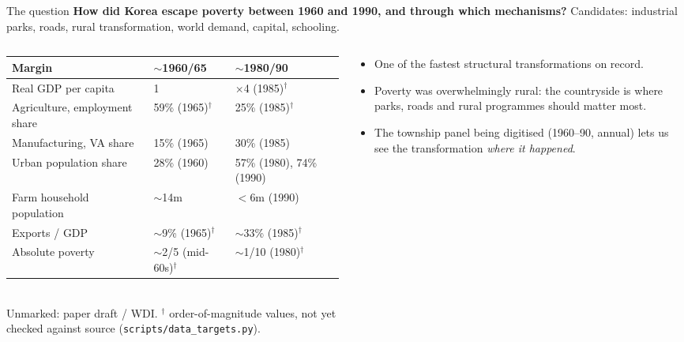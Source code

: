 \documentclass[10pt,aspectratio=169]{beamer}
\newcommand{\hl}[1]{\textcolor{mOrange}{#1}}
\newcommand{\unv}{$^{\dagger}$}
\begin{document}
\begin{frame}{The question}
  \textbf{How did Korea escape poverty between 1960 and 1990, and through which mechanisms?}
  Candidates: industrial parks, roads, rural transformation, world demand, capital, schooling.
  \vspace{0.6em}

  \begin{columns}[T]
    \begin{column}{0.6\textwidth}
      \scriptsize
      \begin{tabular}{@{}lll@{}}
        \toprule
        Margin & $\sim$1960/65 & $\sim$1980/90 \\
        \midrule
        Real GDP per capita & 1 & $\times$4 (1985)\unv \\
        Agriculture, employment share & 59\% (1965)\unv & 25\% (1985)\unv \\
        Manufacturing, VA share & 15\% (1965) & 30\% (1985) \\
        Urban population share & 28\% (1960) & 57\% (1980), 74\% (1990) \\
        Farm household population & $\sim$14m & $<$6m (1990) \\
        Exports / GDP & $\sim$9\% (1965)\unv & $\sim$33\% (1985)\unv \\
        Absolute poverty & $\sim$2/5 (mid-60s)\unv & $\sim$1/10 (1980)\unv \\
        \bottomrule
      \end{tabular}\\[0.3em]
      \tiny Unmarked: paper draft / WDI. \unv{} order-of-magnitude values, not yet checked
      against source (\texttt{scripts/data\_targets.py}).
    \end{column}
    \begin{column}{0.36\textwidth}
      \small
      \begin{itemize}
        \item One of the fastest structural transformations on record.
        \item Poverty was overwhelmingly \hl{rural}: the countryside is where parks, roads
              and rural programmes should matter most.
        \item The township panel being digitised (1960--90, annual) lets us see the
              transformation \emph{where it happened}.
      \end{itemize}
    \end{column}
  \end{columns}
\end{frame}
\end{document}
